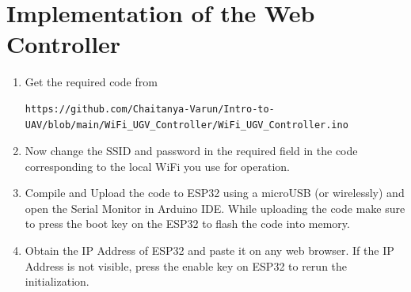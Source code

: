 \documentclass[journal,12pt,twocolumn]{IEEEtran}
\renewcommand\thesection{\arabic{section}}
\begin{document}
\section{Implementation of the Web Controller}
\begin{enumerate}[label=\thesection.\arabic*
,ref=\thesection.\theenumi]
\item Get the required code from 
\begin{lstlisting}
https://github.com/Chaitanya-Varun/Intro-to-UAV/blob/main/WiFi_UGV_Controller/WiFi_UGV_Controller.ino
\end{lstlisting}

%
\item Now change the SSID and password in the required field in the code corresponding to the local WiFi you use for operation.

\item Compile and Upload the code to ESP32 using a microUSB (or wirelessly) and open the Serial Monitor in Arduino IDE. While uploading the code make sure to press the boot key on the ESP32 to flash the code into memory.
\item Obtain the IP Address of ESP32 and paste it on any web browser. If the IP Address is not visible, press the enable key on ESP32 to rerun the initialization.
\end{enumerate}
\end{document}
